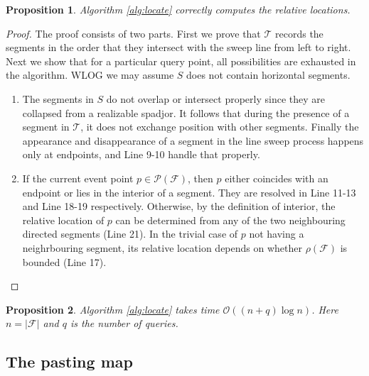 \documentclass[a4paper]{article}
\newtheorem{prop}{Proposition}
\newtheorem{remark}{Remark}
\newcommand{\cF}{\mathcal{F}}
\newcommand{\bigO}[1]{\mathcal{O}(#1)}
\begin{document}
\begin{prop}
  Algorithm \ref{alg:locate} correctly computes the relative locations.
\end{prop}
\begin{proof}
  The proof consists of two parts.
  First we prove that $\mathcal{T}$ records the segments
  in the order that they intersect with the sweep line
  from left to right.
  Next we show that for a particular query point,
  all possibilities are exhausted in the algorithm.
  WLOG we may assume $S$ does not contain horizontal segments.

  \begin{enumerate}
  \item The segments in $S$ do not overlap or intersect properly
    since they are collapsed from a realizable spadjor.
    It follows that during the presence of a segment in $\mathcal{T}$,
    it does not exchange position with other segments.
    Finally the appearance and disappearance of a segment
    in the line sweep process
    happens only at endpoints,
    and Line 9-10 handle that properly.
  \item
    If the current event point $p \in \mathcal{P}(\cF)$,
    then $p$ either coincides with an endpoint
    or lies in the interior of a segment.
    They are resolved in Line 11-13 and Line 18-19 respectively.
    Otherwise, by the definition of interior,
    the relative location of $p$ can be determined
    from any of the two neighbouring directed segments (Line 21).
    In the trivial case of $p$ not having a neighrbouring segment,
    its relative location depends on
    whether $\rho(\cF)$ is bounded (Line 17).
  \end{enumerate}
\end{proof}

\begin{prop}
  Algorithm \ref{alg:locate} takes time $\bigO{(n+q) \log n}$.
  Here $n = \vert \cF \vert$ and $q$ is the number of queries.
\end{prop}


\subsection{The pasting map}
\end{document}
